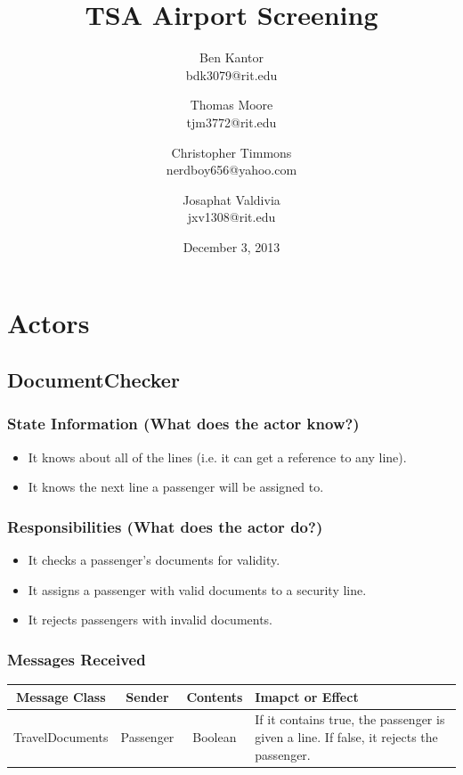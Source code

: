 \documentclass[12pt,letterpaper]{scrartcl}
\title{TSA Airport Screening}
\author{
    Ben Kantor \\
    bdk3079@rit.edu
    \and
    Thomas Moore \\
    tjm3772@rit.edu
    \and
    Christopher Timmons \\
    nerdboy656@yahoo.com
    \and
    Josaphat Valdivia \\
    jxv1308@rit.edu
}
\date{December 3, 2013}
\begin{document}
\maketitle %

\section{Actors}

\subsection*{DocumentChecker}
\subsubsection*{State Information (What does the actor know?)}
\begin{itemize}
    \item It knows about all of the lines (i.e. it can get a reference to any line).
    \item It knows the next line a passenger will be assigned to.
\end{itemize}

\subsubsection*{Responsibilities (What does the actor do?)}
\begin{itemize}
    \item It checks a passenger's documents for validity.
    \item It assigns a passenger with valid documents to a security line.
    \item It rejects passengers with invalid documents.
\end{itemize}

\subsubsection*{Messages Received}
\begin{center}
    \begin{tabulary}{\textwidth}{|c|c|c|L|}
        \hline
        Message Class & Sender & Contents & Imapct or Effect \\
        \hline
        TravelDocuments & Passenger & Boolean & If it contains true, the passenger is given a line. If false, it rejects the passenger. \\
        \hline
    \end{tabulary}
\end{center}
\end{document}
